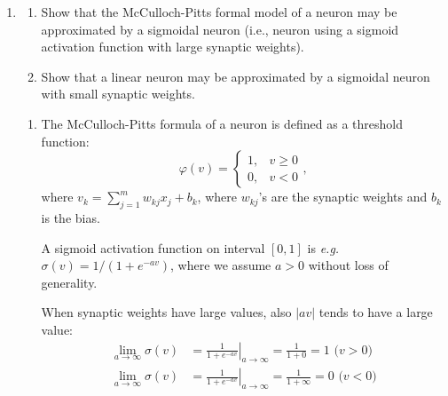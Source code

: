 \begin{enumerate}
\begin{solution}
  \end{solution}
  
  
\item

  \begin{enumerate}
  \item Show that the McCulloch-Pitts formal model
    of a neuron may be approximated by a sigmoidal neuron (i.e.,
    neuron using a sigmoid activation function with large synaptic
    weights).
  \item Show that a linear neuron may be approximated by a sigmoidal
    neuron with small synaptic weights.
  \end{enumerate}
  
  \begin{solution}

    \begin{enumerate}
      
    \item The McCulloch-Pitts formula of a neuron is
      defined as a threshold function:
      \begin{equation}
        \varphi(v) = \left\{ \begin{array}{rl} 1, & v \geq 0 \\ 0, & v <
            0 \end{array} \right.,
      \end{equation}
      where $v_k = \sum_{j=1}^{m} w_{kj} x_j + b_k$, where $w_{kj}$'s are
      the synaptic weights and $b_k$ is the bias.
      
      A sigmoid activation function on interval $[0,1]$ is {\em e.g.}
      $\sigma(v) = 1 / (1 + e^{-av})$, where we assume $a > 0$ without
      loss of generality.
      
      When synaptic weights have large values, also $|a v|$ tends to have
      a large value:
      \begin{equation}
        \begin{aligned}
          \lim_{a \rightarrow \infty} \sigma(v)& = \left. \frac{1}{1 +
              e^{-av}}\right|_{a \rightarrow \infty} = \frac{1}{1+0} = 1 \mbox{\ \ \ \ \ \ ($v>0$)}
          \\
          \lim_{a \rightarrow \infty} \sigma(v)& = \left. \frac{1}{1 +
              e^{-av}}\right|_{a \rightarrow \infty} =
          \frac{1}{1+\infty} = 0 \mbox{\ \ \ \ \ ($v<0$)}
        \end{aligned}
      \end{equation}
      

\end{enumerate}
\end{solution}
\end{enumerate}
